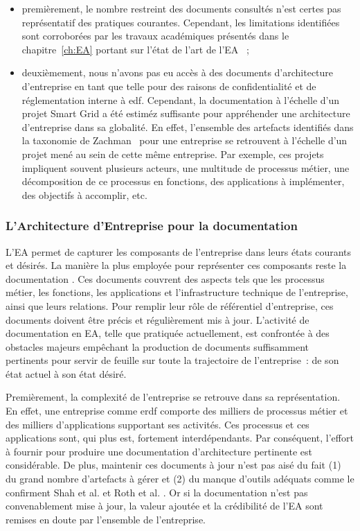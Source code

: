 \begin{itemize}

 \item  premièrement, le nombre restreint des documents consultés
 n'est certes pas représentatif des pratiques courantes. Cependant,
 les limitations identifiées sont corroborées par les travaux
 académiques présentés dans le chapitre~\ref{ch:EA} portant sur
 l'état de l'art de l'EA ~;

 \item deuxièmement, nous n'avons pas eu accès à des documents
 d'architecture d'entreprise en tant que telle pour des raisons de
 confidentialité et de réglementation interne  à \gls{edf}. Cependant,
 la documentation à l'échelle d'un projet Smart Grid a été estiméz
 suffisante pour appréhender une architecture d'entreprise dans sa
 globalité. En effet, l'ensemble des artefacts identifiés dans la taxonomie de
 Zachman~\cite{zachman1987framework} pour une entreprise se
 retrouvent à l'échelle d'un projet
 mené au sein de cette même entreprise. Par exemple, ces projets
 impliquent souvent plusieurs acteurs, une multitude de processus
 métier, une décomposition de ce processus en fonctions, des
 applications à implémenter, des objectifs à accomplir, etc.

\end{itemize}



        \subsubsection{L'Architecture d'Entreprise pour la documentation}


L'EA permet de capturer les composants de l'entreprise dans
leurs états courants et désirés. La manière la plus employée pour représenter
ces composants reste la documentation \cite{barn2013enterprise}. Ces documents
couvrent des aspects tels que les processus métier, les fonctions, les
applications et l'infrastructure technique de l'entreprise, ainsi que leurs
relations. Pour remplir leur rôle de référentiel d'entreprise, ces documents
doivent être précis et régulièrement mis à jour. L'activité de documentation en
EA, telle que pratiquée actuellement, est confrontée à des obstacles majeurs
empêchant la production de documents suffisamment pertinents pour servir de
feuille sur toute la trajectoire de l'entreprise~: de son état actuel à son
état désiré.

Premièrement, la complexité de l'entreprise se retrouve dans sa
représentation. En effet, une entreprise comme \gls{erdf} comporte des milliers
de processus métier et des milliers d'applications supportant ses activités.
Ces processus et ces applications sont, qui plus est, fortement
interdépendants. Par conséquent, l'effort à fournir pour produire une
documentation d'architecture pertinente est considérable. De plus, maintenir
ces documents à jour n'est pas aisé du fait (1) du grand nombre d'artefacts à
gérer et (2) du manque d'outils adéquats comme le confirment Shah et al.
\cite{shah2007frameworks} et Roth et al. \cite{roth2013enterprise}. Or si la
documentation n'est pas convenablement mise à jour, la valeur ajoutée et la
crédibilité de l'EA sont remises en doute par l'ensemble de l'entreprise.

